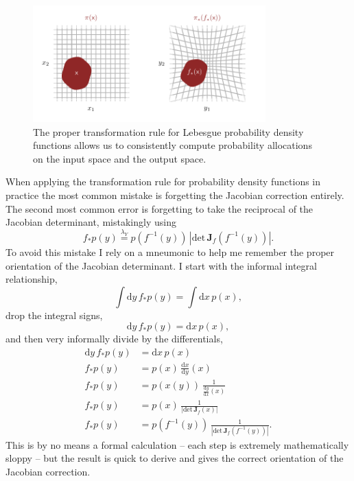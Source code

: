 \documentclass[
  letterpaper,
  DIV=11,
  numbers=noendperiod]{scrartcl}
\begin{document}
\begin{figure}

{\centering \includegraphics[width=0.8\textwidth,height=\textheight]{figures/integration_consistency/integration_consistency.pdf}

}

\caption{\label{fig-integration-consistency}The proper transformation
rule for Lebesgue probability density functions allows us to
consistently compute probability allocations on the input space and the
output space.}

\end{figure}

When applying the transformation rule for probability density functions
in practice the most common mistake is forgetting the Jacobian
correction entirely. The second most common error is forgetting to take
the reciprocal of the Jacobian determinant, mistakingly using \[
f_{*} p(y)
\overset{\lambda_{Y}}{=}
p(f^{-1}(y)) \, | \mathrm{det} \, \mathbf{J}_{f}(f^{-1}(y)) |.
\] To avoid this mistake I rely on a mneumonic to help me remember the
proper orientation of the Jacobian determinant. I start with the
informal integral relationship, \[
\int \mathrm{d} y \, f_{*} p(y) = \int \mathrm{d} x \, p(x),
\] drop the integral signs, \[
\mathrm{d} y \, f_{*} p(y) = \mathrm{d} x \, p(x),
\] and then very informally divide by the differentials, \begin{align*}
\mathrm{d} y \, f_{*} p(y) &= \mathrm{d} x \, p(x)
\\
f_{*} p(y)
&=
p(x) \, \frac{ \mathrm{d} x }{ \mathrm{d} y } (x)
\\
f_{*} p(y)
&=
p(x(y)) \, \frac{1}{ \frac{ \mathrm{d} y }{ \mathrm{d} x }(x) }
\\
f_{*} p(y)
&=
p(x) \, \frac{1}{ | \mathrm{det} \, \mathbf{J}_{f}(x) |}
\\
f_{*} p(y)
&=
p(f^{-1}(y)) \, \frac{1}{ | \mathrm{det} \, \mathbf{J}_{f}(f^{-1}(y)) |}.
\end{align*} This is by no means a formal calculation -- each step is
extremely mathematically sloppy -- but the result is quick to derive and
gives the correct orientation of the Jacobian correction.
\end{document}
